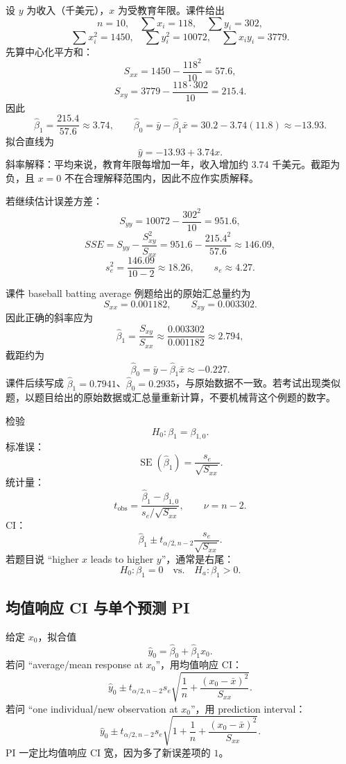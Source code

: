 \documentclass[11pt,a4paper]{article}
\newcommand{\SE}{\operatorname{SE}}
\begin{document}
\begin{examplebox}
设 $y$ 为收入（千美元），$x$ 为受教育年限。课件给出
\[
  n=10,\quad \sum x_i=118,\quad \sum y_i=302,
\]
\[
  \sum x_i^2=1450,\quad \sum y_i^2=10072,\quad \sum x_iy_i=3779.
\]
先算中心化平方和：
\[
  S_{xx}
  =
  1450-\frac{118^2}{10}
  =
  57.6,
\]
\[
  S_{xy}
  =
  3779-\frac{118\cdot302}{10}
  =
  215.4.
\]
因此
\[
  \hat\beta_1=\frac{215.4}{57.6}\approx3.74,
  \qquad
  \hat\beta_0=\bar y-\hat\beta_1\bar x
  =
  30.2-3.74(11.8)
  \approx -13.93.
\]
拟合直线为
\[
  \boxed{\hat y=-13.93+3.74x.}
\]
斜率解释：平均来说，教育年限每增加一年，收入增加约 $3.74$ 千美元。截距为负，且 $x=0$ 不在合理解释范围内，因此不应作实质解释。

若继续估计误差方差：
\[
  S_{yy}
  =
  10072-\frac{302^2}{10}
  =
  951.6,
\]
\[
  SSE
  =
  S_{yy}-\frac{S_{xy}^2}{S_{xx}}
  =
  951.6-\frac{215.4^2}{57.6}
  \approx146.09,
\]
\[
  s_e^2=\frac{146.09}{10-2}\approx18.26,
  \qquad
  s_e\approx4.27.
\]
\end{examplebox}

\begin{warnbox}
课件 baseball batting average 例题给出的原始汇总量约为
\[
  S_{xx}=0.001182,\qquad S_{xy}=0.003302.
\]
因此正确的斜率应为
\[
  \hat\beta_1=\frac{S_{xy}}{S_{xx}}
  \approx
  \frac{0.003302}{0.001182}
  \approx2.794,
\]
截距约为
\[
  \hat\beta_0=\bar y-\hat\beta_1\bar x\approx-0.227.
\]
课件后续写成 $\hat\beta_1=0.7941$、$\hat\beta_0=0.2935$，与原始数据不一致。若考试出现类似题，以题目给出的原始数据或汇总量重新计算，不要机械背这个例题的数字。
\end{warnbox}

\begin{templatebox}[斜率检验与区间]
检验
\[
  H_0:\beta_1=\beta_{1,0}.
\]
标准误：
\[
  \SE(\hat\beta_1)=\frac{s_e}{\sqrt{S_{xx}}}.
\]
统计量：
\[
  t_{\mathrm{obs}}
  =
  \frac{\hat\beta_1-\beta_{1,0}}{s_e/\sqrt{S_{xx}}},
  \qquad
  \nu=n-2.
\]
CI：
\[
  \hat\beta_1
  \pm
  t_{\alpha/2,n-2}\frac{s_e}{\sqrt{S_{xx}}}.
\]
若题目说 “higher $x$ leads to higher $y$”，通常是右尾：
\[
  H_0:\beta_1=0
  \quad\text{vs.}\quad
  H_a:\beta_1>0.
\]
\end{templatebox}

\subsection{均值响应 CI 与单个预测 PI}

\begin{templatebox}
给定 $x_0$，拟合值
\[
  \hat y_0=\hat\beta_0+\hat\beta_1x_0.
\]
若问 “average/mean response at $x_0$”，用均值响应 CI：
\[
  \boxed{
  \hat y_0
  \pm
  t_{\alpha/2,n-2}s_e
  \sqrt{
    \frac1n+\frac{(x_0-\bar x)^2}{S_{xx}}
  }
  }.
\]
若问 “one individual/new observation at $x_0$”，用 prediction interval：
\[
  \boxed{
  \hat y_0
  \pm
  t_{\alpha/2,n-2}s_e
  \sqrt{
    1+\frac1n+\frac{(x_0-\bar x)^2}{S_{xx}}
  }
  }.
\]
PI 一定比均值响应 CI 宽，因为多了新误差项的 $1$。
\end{templatebox}
\end{document}

